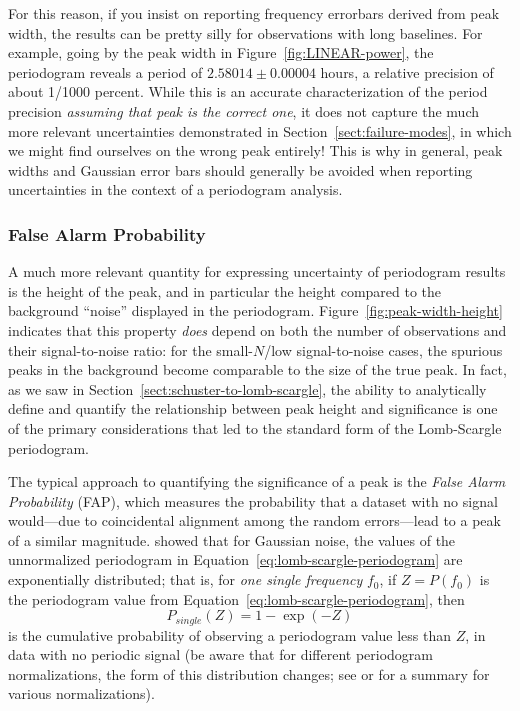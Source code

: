 \documentclass[preprint]{aastex}
\newcommand{\fig}[1]{Figure~\ref{fig:#1}}
\newcommand{\Eq}[1]{Equation~\ref{eq:#1}}
\newcommand{\eq}[1]{\Eq{#1}}
\newcommand{\eqlabel}[1]{\label{eq:#1}}
\newcommand{\Sect}[1]{Section~\ref{sect:#1}}
\newcommand{\sect}[1]{\Sect{#1}}
\newcommand{\sectlabel}[1]{\label{sect:#1}}
\begin{document}
For this reason, if you insist on reporting frequency errorbars derived from
peak width, the results can be pretty silly for observations with
long baselines.
For example, going by the peak width in \fig{LINEAR-power}, the
periodogram reveals a period of $2.58014 \pm 0.00004$ hours, a relative
precision of about 1/1000 percent.
While this is an accurate characterization of the period precision
{\it assuming that peak is the correct one}, it does not capture the
much more relevant uncertainties demonstrated in \sect{failure-modes},
in which we might find ourselves on the wrong peak entirely!
This is why in general, peak widths and Gaussian error bars should generally
be avoided when reporting uncertainties in the context of a periodogram
analysis.

\subsubsection{False Alarm Probability}
\sectlabel{false-alarm-probability}

A much more relevant quantity for expressing uncertainty of periodogram results
is the height of the peak, and in particular the height compared to the
background ``noise'' displayed in the periodogram.
\fig{peak-width-height} indicates that this property {\it does} depend on
both the number of observations and their signal-to-noise ratio: for the
small-$N$/low signal-to-noise cases, the spurious peaks in the background
become comparable to the size of the true peak.
In fact, as we saw in \sect{schuster-to-lomb-scargle}, the ability to
analytically define and quantify the relationship between peak height
and significance is one of the primary considerations that led to the
standard form of the Lomb-Scargle periodogram.

The typical approach to quantifying the significance of a peak is the {\it
False Alarm Probability} (FAP), which measures the probability that a dataset
with no signal would---due to coincidental alignment among the random
errors---lead to a peak of a similar magnitude.
\citet{Scargle82} showed that for Gaussian noise, the values of the unnormalized
periodogram in \eq{lomb-scargle-periodogram} are exponentially distributed;
that is, for {\it one single frequency} $f_0$, if $Z = P(f_0)$ is the
periodogram value from \eq{lomb-scargle-periodogram}, then
\begin{equation}
  P_{single}(Z) = 1 - \exp(-Z)
  \eqlabel{LS-prob-z}
\end{equation}
is the cumulative probability of observing a periodogram value less than $Z$,
in data with no periodic signal
(be aware that for different periodogram normalizations,
the form of this distribution changes; see \citet{Cumming99} or
\citet{Baluev2008} for a summary for various normalizations).
\end{document}
